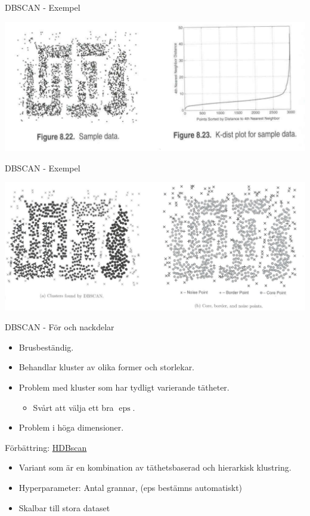 \documentclass[10pt,english]{beamer}
\begin{document}
\begin{frame}{DBSCAN - Exempel}

    \includegraphics[width=\textwidth]{figs/density_cluster.png}
    
\end{frame}

\begin{frame}{DBSCAN - Exempel}
    
    \includegraphics[width=\textwidth]{figs/DBSCAN_cluster_example.png}

\end{frame}

\begin{frame}{DBSCAN - För och nackdelar}

    \begin{itemize}
        \item Brusbeständig.
        \item Behandlar kluster av olika former och storlekar.
        \item Problem med kluster som har tydligt varierande tätheter.
        \begin{itemize}
            \item Svårt att välja ett bra $\operatorname{eps}$.
        \end{itemize}
        \item Problem i höga dimensioner.
    \end{itemize}
    
    Förbättring: \href{https://cran.r-project.org/web/packages/dbscan/vignettes/hdbscan.html}{HDBscan}
    \begin{itemize}
        \item Variant som är en kombination av täthetsbaserad och hierarkisk klustring.
        \item Hyperparameter: Antal grannar, (eps bestämns automatiskt)
        \item Skalbar till stora dataset
    \end{itemize}
    
\end{frame}
\end{document}
